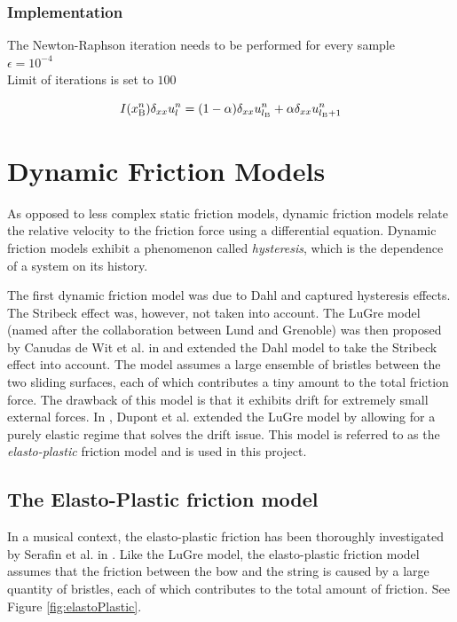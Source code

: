 \subsubsection{Implementation}
The Newton-Raphson iteration needs to be performed for every sample\\

$\epsilon = 10^{-4}$\\
Limit of iterations is set to $100$

\begin{equation}
    I(x_{\text{B}}^n) \delta_{xx} u_l^n = (1-\alpha)\delta_{xx} u_{l_{\text{B}}}^n + \alpha \delta_{xx} u_{l_{\text{B}}+1}^n
\end{equation}

\section{Dynamic Friction Models}
As opposed to less complex static friction models, dynamic friction models relate the relative velocity to the friction force using a differential equation. Dynamic friction models exhibit a phenomenon called \textit{hysteresis}, which is the dependence of a system on its history. 

The first dynamic friction model was due to Dahl \cite{Dahl1968} and captured hysteresis effects. The Stribeck effect was, however, not taken into account. The LuGre model (named after the collaboration between Lund and Grenoble) was then proposed by Canudas de Wit et al. in \cite{Canudas1993, Canudas1995} and extended the Dahl model to take the Stribeck effect into account. The model assumes a large ensemble of bristles between the two sliding surfaces, each of which contributes a tiny amount to the total friction force. The drawback of this model is that it exhibits drift for extremely small external forces. In \cite{Dupont2002}, Dupont et al. extended the LuGre model by allowing for a purely elastic regime that solves the drift issue. This model is referred to as the \textit{elasto-plastic} friction model and is used in this project.

\subsection{The Elasto-Plastic friction model}
In a musical context, the elasto-plastic friction has been thoroughly investigated by Serafin et al. in \cite{Serafin2003, Serafin2004, Avanzini2005}. Like the LuGre model, the elasto-plastic friction model assumes that the friction between the bow and the string is caused by a large quantity of bristles, each of which contributes to the total amount of friction. See Figure \ref{fig:elastoPlastic}.

